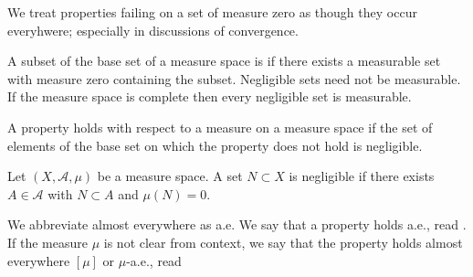 
\sbasic



\sstart



We treat properties failing
on a set of measure zero
as
though they occur everyhwere;
especially in discussions of
convergence.


A subset of
the base set of a measure
space is
if there exists a
measurable set
with measure zero
containing
the subset.
Negligible sets
need not be
measurable.
If the measure space
is complete then every
negligible set is
measurable.

A property holds
with respect to a measure
on a measure space if
the set of elements
of the base set on which
the property does not hold
is negligible.


Let
$(X, \mathcal{A}, \mu)$
be a measure space.
A set
$N \subset X$ is
negligible if there
exists $A \in \mathcal{A}$
with $N \subset A$ and
$\mu(N) = 0$.

We abbreviate almost
everywhere as a.e.
We say that a property
holds a.e., read
.
If the measure $\mu$ is
not clear from context,
we say that the property
holds almost everywhere
$[\mu]$ or
$\mu$-a.e., read

\strats
